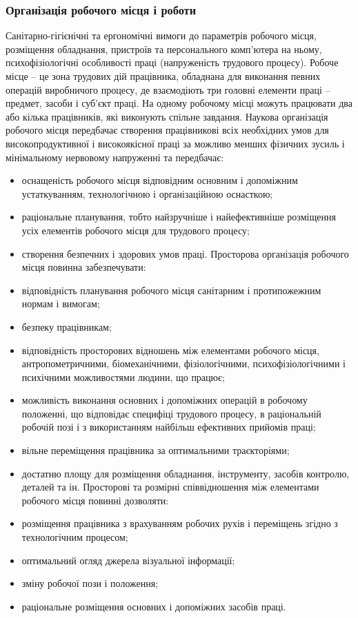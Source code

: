\documentclass[12pt,a4paper]{article}
\begin{document}
\subsubsection{Організація робочого місця і роботи}
Санітарно-гігієнічні та ергономічні вимоги до параметрів робочого місця, розміщення обладнання, пристроїв та персонального комп’ютера на ньому, психофізіологічні особливості праці (напруженість трудового процесу).
Робоче місце – це зона трудових дій працівника, обладнана для виконання певних операцій виробничого процесу, де взаємодіють три головні елементи праці – предмет, засоби і суб’єкт праці. На одному робочому місці можуть працювати два або кілька працівників, які виконують спільне завдання.  Наукова організація робочого місця передбачає створення працівникові всіх необхідних умов для високопродуктивної і високоякісної праці за можливо менших фізичних зусиль і мінімальному нервовому напруженні та передбачає:
\begin{itemize}
\item оснащеність робочого місця відповідним основним і допоміжним устаткуванням, технологічною і організаційною оснасткою;
\item раціональне планування, тобто найзручніше і найефективніше розміщення усіх елементів робочого місця для трудового процесу;
\item створення безпечних і здорових умов праці.
Просторова організація робочого місця повинна забезпечувати:
\item відповідність планування робочого місця санітарним і протипожежним нормам і вимогам;
\item безпеку працівникам;
\item відповідність просторових відношень між елементами робочого місця, антропометричними, біомеханічними, фізіологічними, психофізіологічними і психічними можливостями людини, що працює;
\item можливість виконання основних і допоміжних операцій в робочому положенні, що відповідає специфіці трудового процесу, в раціональній робочій позі і з використанням найбільш ефективних прийомів праці;
\item вільне переміщення працівника за оптимальними траєкторіями;
\item достатню площу для розміщення обладнання, інструменту, засобів контролю, деталей та ін.
Просторові та розмірні співвідношення між елементами робочого місця повинні дозволяти:
\item розміщення працівника з врахуванням робочих рухів і переміщень згідно з технологічним процесом;
\item оптимальний огляд джерела візуальної інформації;
\item зміну робочої пози і положення;
\item раціональне розміщення основних і допоміжних засобів праці.
\end{itemize}
\end{document}
